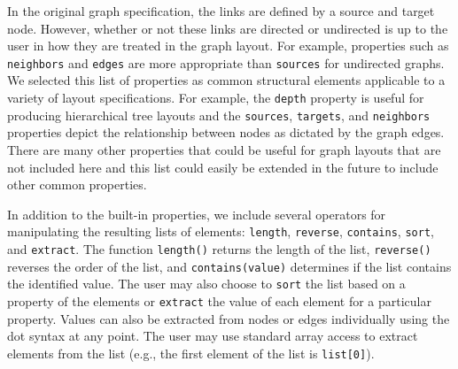 In the original graph specification, the links are defined by a source
and target node. However, whether or not these links are
directed or undirected is up to the user in how they
are treated in the graph layout. For example, properties such as
\texttt{neighbors} and \texttt{edges} are more appropriate than \texttt{sources}
for undirected graphs. We selected this list of properties as common structural elements
applicable to a variety of layout specifications. For example, the \texttt{depth}
property is useful for producing hierarchical tree layouts and the 
\texttt{sources}, \texttt{targets}, and \texttt{neighbors} properties
depict the relationship between nodes as dictated by the graph edges. 
There are many other properties that could be useful for graph layouts that are not included 
here and this list could easily be extended in the future to include other
common properties.

In addition to the built-in properties, we include several operators for 
manipulating the resulting lists of elements: \texttt{length}, \texttt{reverse},
\texttt{contains}, \texttt{sort}, and \texttt{extract}. The function 
\texttt{length()} returns the length of the list, \texttt{reverse()} 
reverses the order of the list, and \texttt{contains(value)} determines if
the list contains the identified value. The user may also choose to \texttt{sort} 
the list based on a property of the elements or \texttt{extract} the value of each
element for a particular property. Values can also be extracted from
nodes or edges individually using the dot syntax at any point. The user may use standard
array access to extract elements from the list (e.g., the first element of
the list is \texttt{list[0]}).


